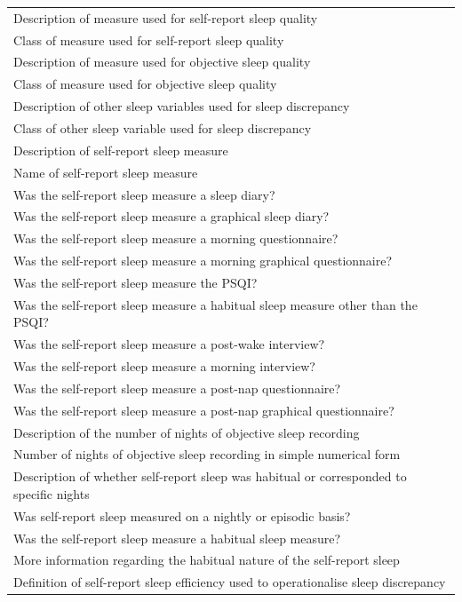\documentclass[
]{article}
\begin{document}
\begin{longtable}[t]{l}
Description of measure used for self-report sleep quality\\
Class of measure used for self-report sleep quality\\
Description of measure used for objective sleep quality\\
\addlinespace
Class of measure used for objective sleep quality\\
Description of other sleep variables used for sleep discrepancy\\
Class of other sleep variable used for sleep discrepancy\\
Description of self-report sleep measure\\
Name of self-report sleep measure\\
\addlinespace
Was the self-report sleep measure a sleep diary?\\
Was the self-report sleep measure a graphical sleep diary?\\
Was the self-report sleep measure a morning questionnaire?\\
Was the self-report sleep measure a morning graphical questionnaire?\\
Was the self-report sleep measure the PSQI?\\
\addlinespace
Was the self-report sleep measure a habitual sleep measure other than the PSQI?\\
Was the self-report sleep measure a post-wake interview?\\
Was the self-report sleep measure a morning interview?\\
Was the self-report sleep measure a post-nap questionnaire?\\
Was the self-report sleep measure a post-nap graphical questionnaire?\\
\addlinespace
Description of the number of nights of objective sleep recording\\
Number of nights of objective sleep recording in simple numerical form\\
Description of whether self-report sleep was habitual or corresponded to specific nights\\
Was self-report sleep measured on a nightly or episodic basis?\\
Was the self-report sleep measure a habitual sleep measure?\\
\addlinespace
More information regarding the habitual nature of the self-report sleep\\
Definition of self-report sleep efficiency used to operationalise sleep discrepancy\\

\end{longtable}
\end{document}

